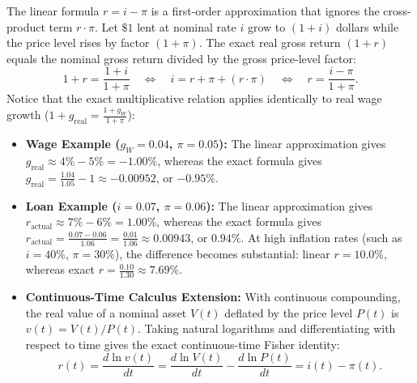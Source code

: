 \documentclass[11pt,letterpaper]{article}
\begin{document}
\begin{casestudy}
The linear formula $r = i - \pi$ is a first-order approximation that ignores the cross-product term $r \cdot \pi$. Let $\$1$ lent at nominal rate $i$ grow to $(1 + i)$ dollars while the price level rises by factor $(1 + \pi)$. The exact real gross return $(1 + r)$ equals the nominal gross return divided by the gross price-level factor:
$$1 + r = \frac{1 + i}{1 + \pi} \quad \Longleftrightarrow \quad i = r + \pi + (r \cdot \pi) \quad \Longleftrightarrow \quad r = \frac{i - \pi}{1 + \pi}.$$
Notice that the exact multiplicative relation applies identically to real wage growth ($1 + g_{\text{real}} = \frac{1 + g_W}{1 + \pi}$):
\begin{itemize}
    \item \textbf{Wage Example ($g_W = 0.04$, $\pi = 0.05$):} The linear approximation gives $g_{\text{real}} \approx 4\% - 5\% = -1.00\%$, whereas the exact formula gives $g_{\text{real}} = \frac{1.04}{1.05} - 1 \approx -0.00952$, or $-0.95\%$.
    \item \textbf{Loan Example ($i = 0.07$, $\pi = 0.06$):} The linear approximation gives $r_{\text{actual}} \approx 7\% - 6\% = 1.00\%$, whereas the exact formula gives $r_{\text{actual}} = \frac{0.07 - 0.06}{1.06} = \frac{0.01}{1.06} \approx 0.00943$, or $0.94\%$. At high inflation rates (such as $i = 40\%$, $\pi = 30\%$), the difference becomes substantial: linear $r = 10.0\%$, whereas exact $r = \frac{0.10}{1.30} \approx 7.69\%$.
    \item \textbf{Continuous-Time Calculus Extension:} With continuous compounding, the real value of a nominal asset $V(t)$ deflated by the price level $P(t)$ is $v(t) = V(t)/P(t)$. Taking natural logarithms and differentiating with respect to time gives the exact continuous-time Fisher identity:
    $$r(t) = \frac{d \ln v(t)}{dt} = \frac{d \ln V(t)}{dt} - \frac{d \ln P(t)}{dt} = i(t) - \pi(t).$$
\end{itemize}
\end{casestudy}
\end{document}
